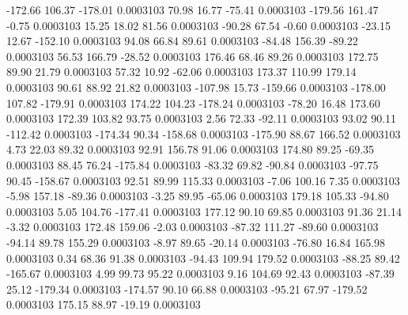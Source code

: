      -172.66      106.37     -178.01     0.0003103
       70.98       16.77      -75.41     0.0003103
     -179.56      161.47       -0.75     0.0003103
       15.25       18.02       81.56     0.0003103
      -90.28       67.54       -0.60     0.0003103
      -23.15       12.67     -152.10     0.0003103
       94.08       66.84       89.61     0.0003103
      -84.48      156.39      -89.22     0.0003103
       56.53      166.79      -28.52     0.0003103
      176.46       68.46       89.26     0.0003103
      172.75       89.90       21.79     0.0003103
       57.32       10.92      -62.06     0.0003103
      173.37      110.99      179.14     0.0003103
       90.61       88.92       21.82     0.0003103
     -107.98       15.73     -159.66     0.0003103
     -178.00      107.82     -179.91     0.0003103
      174.22      104.23     -178.24     0.0003103
      -78.20       16.48      173.60     0.0003103
      172.39      103.82       93.75     0.0003103
        2.56       72.33      -92.11     0.0003103
       93.02       90.11     -112.42     0.0003103
     -174.34       90.34     -158.68     0.0003103
     -175.90       88.67      166.52     0.0003103
        4.73       22.03       89.32     0.0003103
       92.91      156.78       91.06     0.0003103
      174.80       89.25      -69.35     0.0003103
       88.45       76.24     -175.84     0.0003103
      -83.32       69.82      -90.84     0.0003103
      -97.75       90.45     -158.67     0.0003103
       92.51       89.99      115.33     0.0003103
       -7.06      100.16        7.35     0.0003103
       -5.98      157.18      -89.36     0.0003103
       -3.25       89.95      -65.06     0.0003103
      179.18      105.33      -94.80     0.0003103
        5.05      104.76     -177.41     0.0003103
      177.12       90.10       69.85     0.0003103
       91.36       21.14       -3.32     0.0003103
      172.48      159.06       -2.03     0.0003103
      -87.32      111.27      -89.60     0.0003103
      -94.14       89.78      155.29     0.0003103
       -8.97       89.65      -20.14     0.0003103
      -76.80       16.84      165.98     0.0003103
        0.34       68.36       91.38     0.0003103
      -94.43      109.94      179.52     0.0003103
      -88.25       89.42     -165.67     0.0003103
        4.99       99.73       95.22     0.0003103
        9.16      104.69       92.43     0.0003103
      -87.39       25.12     -179.34     0.0003103
     -174.57       90.10       66.88     0.0003103
      -95.21       67.97     -179.52     0.0003103
      175.15       88.97      -19.19     0.0003103

